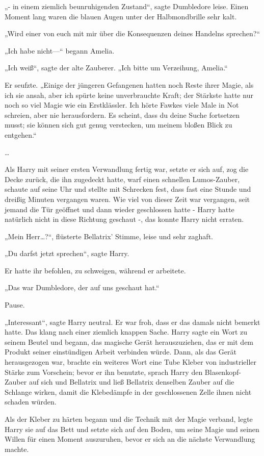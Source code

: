 {„- in einem ziemlich beunruhigenden Zustand“, sagte Dumbledore leise. Einen Moment lang waren die blauen Augen unter der Halbmondbrille sehr kalt.

„Wird einer von euch mit mir über die Konsequenzen deines Handelns sprechen?“

„Ich habe nicht—“ begann Amelia.

„Ich weiß“, sagte der alte Zauberer. „Ich bitte um Verzeihung, Amelia.“

Er seufzte. „Einige der jüngeren Gefangenen hatten noch Reste ihrer Magie, als ich sie ansah, aber ich spürte keine unverbrauchte Kraft; der Stärkste hatte nur noch so viel Magie wie ein Erstklässler. Ich hörte Fawkes viele Male in Not schreien, aber nie herausfordern. Es scheint, dass du deine Suche fortsetzen musst; sie können sich gut genug verstecken, um meinem bloßen Blick zu entgehen.“

…

Als Harry mit seiner ersten Verwandlung fertig war, setzte er sich auf, zog die Decke zurück, die ihn zugedeckt hatte, warf einen schnellen Lumos-Zauber, schaute auf seine Uhr und stellte mit Schrecken fest, dass fast eine Stunde und dreißig Minuten vergangen waren. Wie viel von dieser Zeit war vergangen, seit jemand die Tür geöffnet und dann wieder geschlossen hatte - Harry hatte natürlich nicht in diese Richtung geschaut -, das konnte Harry nicht erraten.

„Mein Herr…?“, flüsterte Bellatrix' Stimme, leise und sehr zaghaft.

„Du darfst jetzt sprechen“, sagte Harry.

Er hatte ihr befohlen, zu schweigen, während er arbeitete.

„Das war Dumbledore, der auf uns geschaut hat.“

Pause.

„Interessant“, sagte Harry neutral. Er war froh, dass er das damals nicht bemerkt hatte. Das klang nach einer ziemlich knappen Sache. Harry sagte ein Wort zu seinem Beutel und begann, das magische Gerät herauszuziehen, das er mit dem Produkt seiner einstündigen Arbeit verbinden würde. Dann, als das Gerät herausgezogen war, brachte ein weiteres Wort eine Tube Kleber von industrieller Stärke zum Vorschein; bevor er ihn benutzte, sprach Harry den Blasenkopf-Zauber auf sich und Bellatrix und ließ Bellatrix denselben Zauber auf die Schlange wirken, damit die Klebedämpfe in der geschlossenen Zelle ihnen nicht schaden würden.

Als der Kleber zu härten begann und die Technik mit der Magie verband, legte Harry sie auf das Bett und setzte sich auf den Boden, um seine Magie und seinen Willen für einen Moment auszuruhen, bevor er sich an die nächste Verwandlung machte.

}
